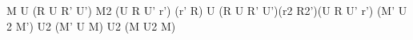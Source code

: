 M U (R U R' U') M2 (U R U' r')
(r' R) U (R U R' U')(r2 R2')(U R U' r')
(M' U 2 M') U2 (M' U M) U2 (M U2 M)
